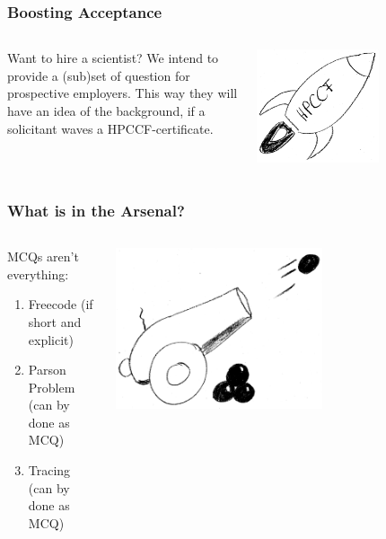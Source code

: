 \begin{frame}
 \frametitle{Boosting Acceptance}
 \begin{columns}
   \begin{column}{.5\textwidth}
     Want to hire a scientist? \newline
     We intend to provide a (sub)set of question for prospective employers. This way they will have an idea of the background, if a solicitant waves a HPCCF-certificate.
   \end{column}
   \begin{column}{.5\textwidth}
       \centering
      \includegraphics[width=0.6\textwidth]{images/hpccf_boost}
    \end{column}
  \end{columns}
\end{frame}

\begin{frame}
  \frametitle{What is in the Arsenal?}
  \begin{columns}
   \begin{column}{.5\textwidth}
    MCQs aren't everything:
     \begin{enumerate}
      \item Freecode (if short and explicit)
      \item Parson Problem (can by done as MCQ)
      \item Tracing (can by done as MCQ)
     \end{enumerate}
   \end{column}
   \begin{column}{.5\textwidth}
       \centering
      \includegraphics[width=0.6\textwidth]{images/arsenal2}
    \end{column}
  \end{columns}
\end{frame}


